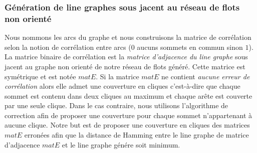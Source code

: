 \subsubsection{G\'en\'eration de line graphes sous jacent au r\'eseau de flots non orient\'e}
Nous nommons les arcs du graphe et nous construisons la matrice de corr\'elation selon la notion de corr\'elation entre arcs ($0$ aucuns sommets en commun sinon $1$).
La matrice binaire de corr\'elation est la {\em matrice d'adjacence du line graphe} sous jacent au graphe non orient\'e de notre r\'eseau de flots g\'en\'er\'e. Cette matrice est sym\'etrique et est not\'ee $matE$. \newline
Si la matrice $matE$ ne contient {\em aucune erreur de corr\'elation} alors elle admet une couverture en cliques c'est-\`a-dire que chaque sommet est contenu dans deux cliques au maximum et chaque ar\^ete est couverte par une seule clique.
Dans le cas contraire, nous utilisons l'algorithme de correction afin de proposer une couverture pour chaque sommet n'appartenant \`a aucune clique. 
\newline
Notre but est de proposer une couverture en cliques des matrices $matE$ erron\'ees afin que 
la distance de Hamming entre le line graphe de matrice d'adjacence $matE$ et le line graphe g\'en\'ere soit minimum. 

